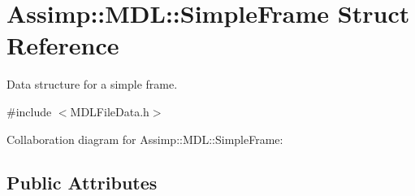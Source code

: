 \hypertarget{struct_assimp_1_1_m_d_l_1_1_simple_frame}{\section{Assimp\+:\+:M\+D\+L\+:\+:Simple\+Frame Struct Reference}
\label{struct_assimp_1_1_m_d_l_1_1_simple_frame}
}


Data structure for a simple frame.  




{\ttfamily \#include $<$M\+D\+L\+File\+Data.\+h$>$}



Collaboration diagram for Assimp\+:\+:M\+D\+L\+:\+:Simple\+Frame\+:
\subsection*{Public Attributes}
